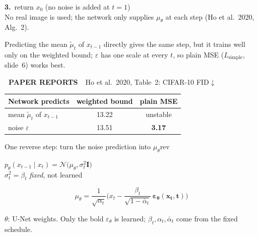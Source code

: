 \documentclass[aspectratio=169,9pt,xcolor=table]{beamer}
\newcommand{\Normal}{\mathcal{N}}
\newcommand{\Id}{\mathbf{I}}
\newcommand{\eps}{\varepsilon}
\newcommand{\ab}{\bar{\alpha}}
\newcommand{\pill}[2]{{\setlength{\fboxsep}{1.2pt}\colorbox{#1}{\color{white}\fontsize{6}{7}\selectfont\bfseries\ #2\ }}}
\newcommand{\paper}{\pill{hcmusblue}{PAPER REPORTS}}
\begin{document}
\begin{frame}
\begin{tcbraster}
\begin{tcolorbox}[colframe=rev,colback=rev!5!white,title={Sampling: generate a new image},width=.4\linewidth]
\textbf{3.}~return $x_0$ \quad(no noise is added at $t=1$)\\[0.8mm]
{\color{muted}No real image is used; the network only supplies $\mu_\theta$ at each step (Ho et al.\ 2020, Alg.~2).}
\end{tcolorbox}
\begin{tcolorbox}[colframe=hcmusblue,colback=hcmusblue!5!white,title={Why predict $\eps$, not the mean $\tilde\mu_t$?},width=.6\linewidth-3mm]
Predicting the mean $\tilde\mu_t$ of $x_{t-1}$ directly gives the same step, but it trains well only on the weighted bound; $\eps$ has one scale at every $t$, so plain MSE ($L_{\text{simple}}$, slide~6) works best.\par\vspace{0.6mm}
{\centering\setlength{\tabcolsep}{5pt}\renewcommand{\arraystretch}{1.0}%
{\scriptsize\paper\ Ho et al.\ 2020, Table~2: CIFAR-10 FID$\downarrow$}\\[0.5mm]
\begin{tabular}{@{}lcc@{}}
\toprule
Network predicts & weighted bound & plain MSE\\
\midrule
mean $\tilde\mu_t$ of $x_{t-1}$ & 13.22 & unstable\\
noise $\eps$ & 13.51 & \textbf{3.17}\\
\bottomrule
\end{tabular}\par}
\end{tcolorbox}
\end{tcbraster}
\vspace{2.5mm}
\begin{tbox}[fontupper=\footnotesize,before skip=0pt,after skip=0pt]{One reverse step: turn the noise prediction into $\mu_\theta$}{rev}
\setlength{\abovedisplayskip}{0pt}\setlength{\belowdisplayskip}{0pt}
\begin{minipage}[c]{.3\linewidth}\raggedright
$p_\theta(x_{t-1}\mid x_t)=\Normal\big(\mu_\theta,\sigma_t^2\Id\big)$\\[0.5mm]
$\sigma_t^2=\beta_t$ \emph{fixed}, not learned
\end{minipage}\hfill
\begin{minipage}[c]{.36\linewidth}
\[\mu_\theta=\frac{1}{\sqrt{\alpha_t}}\Big(x_t-\frac{\beta_t}{\sqrt{1-\ab_t}}\,\boldsymbol{\eps_\theta(x_t,t)}\Big)\]
\end{minipage}\hfill
\begin{minipage}[c]{.3\linewidth}\raggedright
$\theta$: U-Net weights. Only the bold $\eps_\theta$ is learned; $\beta_t,\alpha_t,\ab_t$ come from the fixed schedule.

\end{minipage}
\end{tbox}
\end{frame}
\end{document}
